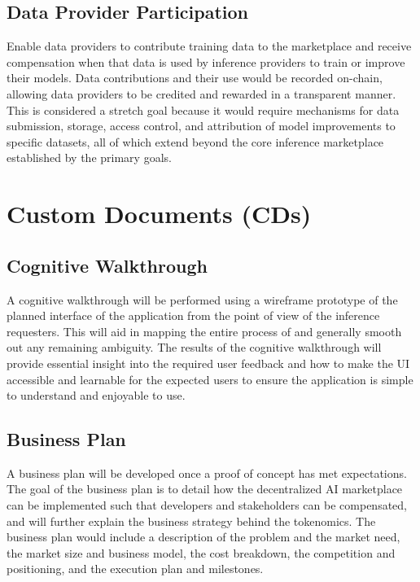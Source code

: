 \documentclass{article}
\begin{document}
\subsection{Data Provider Participation}
Enable data providers to contribute training data to the marketplace and receive 
compensation when that data is used by inference providers to train or improve their 
models. Data contributions and their use would be recorded on-chain, allowing data 
providers to be credited and rewarded in a transparent manner. This is considered a 
stretch goal because it would require mechanisms for data submission, storage, access 
control, and attribution of model improvements to specific datasets, all of which 
extend beyond the core inference marketplace established by the primary goals.


\section{Custom Documents (CDs)}

\subsection{Cognitive Walkthrough}

A cognitive walkthrough will be performed using a wireframe prototype of the 
planned interface of the application from the point of view of the inference requesters. 
This will aid in mapping the entire process of \progname{} and generally smooth out any remaining 
ambiguity. The results of the cognitive walkthrough will provide essential insight into the 
required user feedback and how to make the UI accessible and learnable for the expected users 
to ensure the application is simple to understand and enjoyable to use. 

\subsection{Business Plan}

A business plan will be developed once a proof of concept has met expectations. The goal 
of the business plan is to detail how the decentralized AI marketplace can be implemented 
such that developers and stakeholders can be compensated, and will further explain the 
business strategy behind the tokenomics. The business plan would include a description
of the problem and the market need, the market size and business model, the cost breakdown,
the competition and positioning, and the execution plan and milestones.
\end{document}
